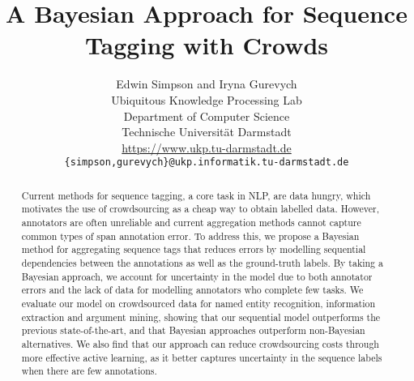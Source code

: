 \documentclass[11pt,a4paper]{article}
\title{A Bayesian Approach for Sequence Tagging with Crowds}
\author{Edwin Simpson and Iryna Gurevych\\
  Ubiquitous Knowledge Processing Lab \\
  Department of Computer Science \\
  Technische Universit\"at Darmstadt \\
  \url{https://www.ukp.tu-darmstadt.de} \\
  {\tt \{simpson,gurevych\}@ukp.informatik.tu-darmstadt.de}
}
\begin{document}
\maketitle


\begin{abstract}
Current methods for sequence tagging, a core task in NLP, are data hungry,
which motivates the use of crowdsourcing as a cheap way to obtain labelled data.
However, annotators are often unreliable and current aggregation methods cannot capture common types of span annotation error.
To address this, we propose a Bayesian method for aggregating sequence tags
 that reduces errors by modelling sequential dependencies between the
 annotations as well as the ground-truth labels.
By taking a Bayesian approach, we account for uncertainty in the model due to both
annotator errors and 
the lack of data for modelling annotators who complete few tasks.
We evaluate our model on crowdsourced data for named entity recognition, information extraction and argument mining,
showing that our sequential model outperforms the previous state-of-the-art, 
and that Bayesian approaches outperform non-Bayesian alternatives.
We also find that our approach can reduce crowdsourcing costs through
 more effective active learning, as it 
better captures uncertainty in the sequence labels when there are few annotations.
\end{abstract}











%
% 



\appendix

\end{document}
